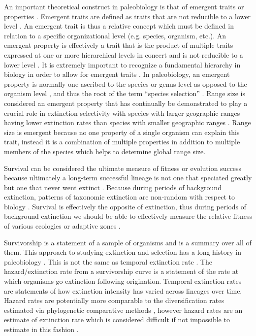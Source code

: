 \documentclass[12pt,letterpaper]{article}
\begin{document}
An important theoretical construct in paleobiology is that of emergent traits or properties \citep{Jablonski2008a,Vrba1984}. Emergent traits are defined as traits that are not reducible to a lower level \citep{Grantham1995,Vrba1984,Jablonski2008a,Lloyd1993}. An emergent trait is thus a relative concept which must be defined in relation to a specific organizational level (e.g. species, organism, etc.). An emergent property is effectively a trait that is the product of multiple traits expressed at one or more hierarchical levels in concert and is not reducible to a lower level \citep{Vrba1984,Jablonski2008a}. It is extremely important to recognize a fundamental hierarchy in biology in order to allow for emergent traits \citet{Vrba1984}. In paleobiology, an emergent property is normally one ascribed to the species or genus level as opposed to the organism level \citep{Grantham1995,Jablonski2008a,Vrba1984b,Lloyd1993}, and thus the root of the term ``species selection'' \citep{Jablonski2008a,Vrba1984,Lloyd1993}. Range size is considered an emergent property that has continually be demonstrated to play a crucial role in extinction selectivity with species with larger geographic ranges having lower extinction rates than species with smaller geographic ranges \citep{Jablonski1986,Harnik2013,Nurnberg2013a}. Range size is emergent because no one property of a single organism can explain this trait, instead it is a combination of multiple properties in addition to multiple members of the species which helps to determine global range size.

Survival can be considered the ultimate measure of fitness or evolution success \citep{Cooper1984,Palmer2012} because ultimately a long-term successful lineage is not one that speciated greatly but one that never went extinct \citep{Palmer2012}. Because during periods of background extinction, patterns of taxonomic extinction are non-random with respect to biology \citep{Jablonski1986}. Survival is effectively the opposite of extinction, thus during periods of background extinction we should be able to effectively measure the relative fitness of various ecologies or adaptive zones \citep{Simpson1944,Kitchell1990,Kitchell1985a,VanValen1973}. 

Survivorship is a statement of a sample of organisms and is a summary over all of them. This approach to studying extinction and selection has a long history in paleobiology \citep{Simpson1944,VanValen1979,Foote1988,Baumiller1993,Kitchell1987b,Kitchell1990,Simpson1953,Raup1991a,Simpson2006}. This is not the same as temporal extinction rate \citep{Foote2000,Foote2000a,Alroy2010b,Alroy2010,Alroy2010c}. The hazard/extinction rate from a survivorship curve is a statement of the rate at which organisms go extinction following origination. Temporal extinction rates are statements of how extinction intensity has varied across lineages over time. Hazard rates are potentially more comparable to the diversification rates estimated via phylogenetic comparative methods \citep{Fitzjohn2010,Maddison2007,Rabosky2013,Nee2001,Nee1994d,Nee1992}, however hazard rates are an estimate of extinction rate which is considered difficult if not impossible to estimate in this fashion \citep{Rabosky2010a}.
\end{document}
